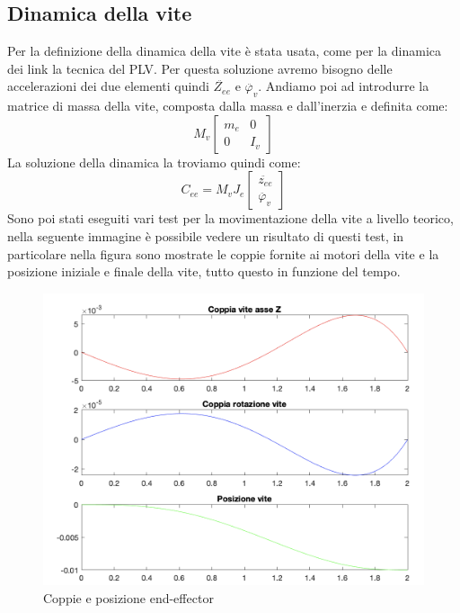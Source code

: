 \subsection{Dinamica della vite}
Per la definizione della dinamica della vite è stata usata, come per la dinamica dei link la tecnica del PLV. Per questa soluzione avremo bisogno delle accelerazioni dei due elementi quindi $\ddot{Z_{ee}}$ e $\ddot{\varphi_v}$. Andiamo poi ad introdurre la matrice di massa della vite, composta dalla massa e dall'inerzia e definita come:
\begin{equation}
	M_v\begin{bmatrix}
	m_e & 0 \\ 0 & I_v
	\end{bmatrix}
\end{equation} 
La soluzione della dinamica la troviamo quindi come:
\begin{equation}
    C_{ee} = M_v
    J_e \begin{bmatrix}
    \ddot{z_{ee}} \\ \ddot{\varphi_v}
    \end{bmatrix}
\end{equation}
Sono poi stati eseguiti vari test per la movimentazione della vite a livello teorico, nella seguente immagine è possibile vedere un risultato di questi test, in particolare nella figura sono mostrate le coppie fornite ai motori della vite e la posizione iniziale e finale della vite, tutto questo in funzione del tempo.
\begin{figure}[ht]
\begin{center}
    \includegraphics[scale=0.65]{Immagini/coppiaTeoricaVite.png}
    \caption{Coppie e posizione end-effector}
\end{center}
\end{figure}
